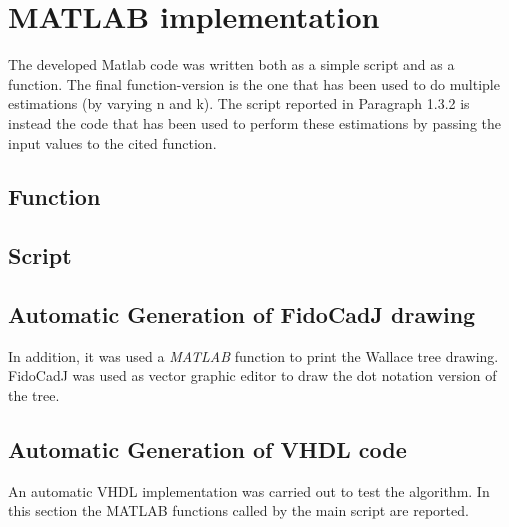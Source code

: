 \section{MATLAB implementation}
The developed Matlab code was written both as a simple script and as a function. The final function-version is the one that has been used to do multiple estimations (by varying n and k). The script reported in Paragraph 1.3.2 is instead the code that has been used to perform these estimations by passing the input values to the cited function.

\subsection{Function}

\subsection{Script}

\subsection{Automatic Generation of FidoCadJ drawing}
In addition, it was used a \emph{MATLAB} function to print the Wallace tree drawing. FidoCadJ was used as vector graphic editor to draw the dot notation version of the tree.


\subsection{Automatic Generation of VHDL code}
An automatic VHDL implementation was carried out to test the algorithm. In this section the MATLAB functions called by the main script are reported.



